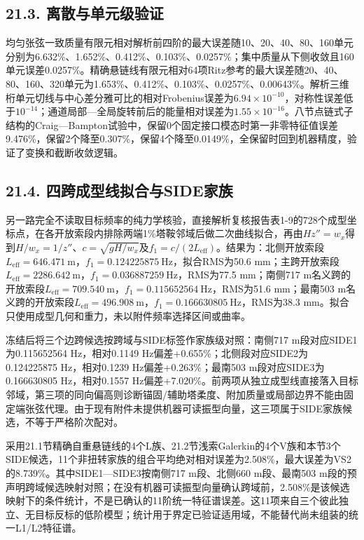\documentclass[UTF8,a4paper,11pt,fontset=none]{ctexart}
\begin{document}
\subsection*{21.3. 离散与单元级验证}
均匀张弦一致质量有限元相对解析前四阶的最大误差随10、20、40、80、160单元分别为6.632\%、1.652\%、0.412\%、0.103\%、0.0257\%；集中质量从下侧收敛且160单元误差0.0257\%。精确悬链线有限元相对64项Ritz参考的最大误差随20、40、80、160、320单元为1.653\%、0.412\%、0.103\%、0.0257\%、0.00643\%。解析三维桁单元切线与中心差分雅可比的相对Frobenius误差为\(6.94\times10^{-10}\)\allowbreak{}，对称性误差低于\(10^{-14}\)\allowbreak{}；通道局部—全局旋转前后的能量相对误差为\(1.55\times10^{-16}\)\allowbreak{}。八节点链式子结构的Craig—Bampton试验中，保留0个固定接口模态时第一非零特征值误差9.476\%，保留2个降至0.307\%，保留4个降至0.0149\%，全保留时回到机器精度，验证了变换和截断收敛逻辑。\par
{}
\subsection*{21.4. 四跨成型线拟合与SIDE家族}
另一路完全不读取目标频率的纯力学核验，直接解析复核报告表1-9的728个成型坐标点，在各开放索段内排除两端1\%塔鞍邻域后做二次曲线拟合，再由\(Hz''=w_x\)\allowbreak{}得到\(H/w_x=1/z''\)\allowbreak{}、\(c=\sqrt{gH/w_x}\)\allowbreak{}及\(f_1=c/(2L_{\mathrm{eff}})\)\allowbreak{}。结果为：北侧开放索段\(L_{\mathrm{eff}}=646.471\ \mathrm m\)\allowbreak{}，\(f_1=0.124225875\ \mathrm{Hz}\)\allowbreak{}，拟合RMS为50.6 mm；主跨开放索段\(L_{\mathrm{eff}}=2286.642\ \mathrm m\)\allowbreak{}，\(f_1=0.036887259\ \mathrm{Hz}\)\allowbreak{}，RMS为77.5 mm；南侧717 m名义跨的开放索段\(L_{\mathrm{eff}}=709.540\ \mathrm m\)\allowbreak{}，\(f_1=0.115652564\ \mathrm{Hz}\)\allowbreak{}，RMS为51.6 mm；最南503 m名义跨的开放索段\(L_{\mathrm{eff}}=496.908\ \mathrm m\)\allowbreak{}，\(f_1=0.166630805\ \mathrm{Hz}\)\allowbreak{}，RMS为38.3 mm。拟合只使用成型几何和重力，未以附件频率选择区间或曲率。\par
冻结后将三个边跨候选按跨域与SIDE标签作家族级对照：南侧717 m段对应SIDE1为0.115652564 Hz，相对0.1149 Hz偏差+0.655\%；北侧段对应SIDE2为0.124225875 Hz，相对0.1239 Hz偏差+0.263\%；最南503 m段对应SIDE3为0.166630805 Hz，相对0.1557 Hz偏差+7.020\%。前两项从独立成型线直接落入目标邻域，第三项的同向偏高则诊断锚固/辅助塔柔度、附加质量或局部边界不能由固定端张弦代理。由于现有附件未提供机器可读振型向量，这三项属于SIDE家族候选，不等于严格阶次配对。\par
采用21.1节精确自重悬链线的4个L族、21.2节浅索Galerkin的4个V族和本节3个SIDE候选，11个非扭转家族的组合平均绝对相对误差为2.508\%，最大误差为VS2的8.739\%。其中SIDE1—SIDE3按南侧717 m段、北侧660 m段、最南503 m段的预声明跨域候选映射对照；在没有机器可读振型向量确认跨域前，2.508\%是该候选映射下的条件统计，不是已确认的11阶统一特征谱误差。这11项来自三个彼此独立、无目标反标的低阶模型；统计用于界定已验证适用域，不能替代尚未组装的统一L1/L2特征谱。\par
{}
\end{document}
